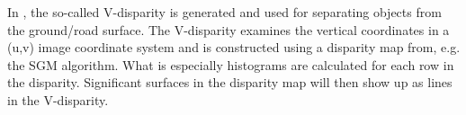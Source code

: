 In \cite{labayrade2003onboard}, the so-called V-disparity is generated and used for separating objects from the ground/road surface. The V-disparity examines the vertical coordinates in a (u,v) image coordinate system and is constructed using a disparity map from, e.g. the SGM algorithm. What is especially histograms are calculated for each row in the disparity. Significant surfaces in the disparity map will then show up as lines in the V-disparity. %

